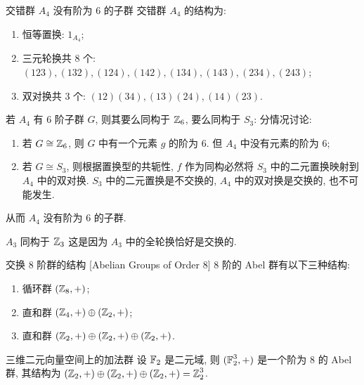             \begin{xmp}
                {交错群 \(A_4\) 没有阶为 \(6\) 的子群}
                交错群 \(A_4\) 的结构为: \begin{enumerate}
                    \item 恒等置换: \(1_{A_4}\);
                    \item 三元轮换共 8 个: \((123), (132), (124), (142), (134), (143), (234), (243)\);
                    \item 双对换共 3 个: \((12)(34), (13)(24), (14)(23)\).
                \end{enumerate}
                若 \(A_4\) 有 \(6\) 阶子群 \(G\), 则其要么同构于 \(\operatorname{\mathbb{Z}}_6\), 要么同构于 \(S_3\): 分情况讨论: \begin{enumerate}[label=\arabic*)]
                    \item 若 \(G\cong\operatorname{\mathbb{Z}}_6\), 则 \(G\) 中有一个元素 \(g\) 的阶为 \(6\). 但 \(A_4\) 中没有元素的阶为 \(6\);
                    \item 若 \(G\cong S_3\), 则根据置换型的共轭性, \(f\) 作为同构必然将 \(S_3\) 中的二元置换映射到 \(A_4\) 中的双对换. \(S_3\) 中的二元置换是不交换的, \(A_4\) 中的双对换是交换的, 也不可能发生.
                \end{enumerate}
                从而 \(A_4\) 没有阶为 \(6\) 的子群.
            \end{xmp}

            \begin{ppt}
                {\(A_3\) 同构于 \(\operatorname{\mathbb{Z}}_3\)}
                这是因为 \(A_3\) 中的全轮换恰好是交换的.
            \end{ppt}

            \begin{xmp}
                {交换 \(8\) 阶群的结构}
                [Abelian Groups of Order \(8\)]
                \(8\) 阶的 Abel 群有以下三种结构:
                \begin{enumerate}
                    \item 循环群 \((\operatorname{\mathbb{Z}}_8, +)\);
                    \item 直和群 \((\operatorname{\mathbb{Z}}_4, +)\oplus (\operatorname{\mathbb{Z}}_2, +)\);
                    \item 直和群 \((\operatorname{\mathbb{Z}}_2, +)\oplus (\operatorname{\mathbb{Z}}_2, +)\oplus (\operatorname{\mathbb{Z}}_2, +)\).
                \end{enumerate}
            \end{xmp}

            \begin{ins}
                {三维二元向量空间上的加法群}
                设 \(\operatorname{\mathbb{F}}_2\) 是二元域, 则 \((\operatorname{\mathbb{F}}_2^3, +)\) 是一个阶为 \(8\) 的 Abel 群, 其结构为 \((\operatorname{\mathbb{Z}}_2, +)\oplus (\operatorname{\mathbb{Z}}_2, +)\oplus (\operatorname{\mathbb{Z}}_2, +)=\operatorname{\mathbb{Z}}_2^3\).
            \end{ins}

